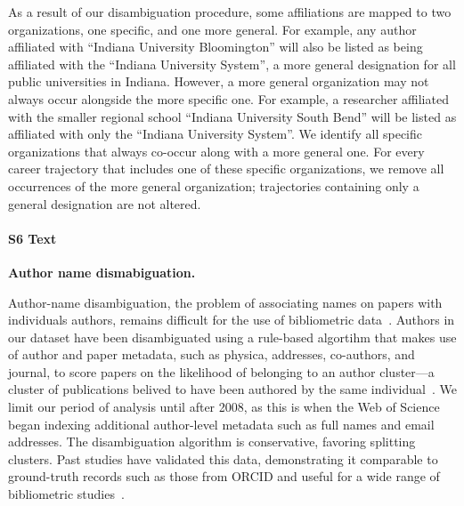 \documentclass[12pt]{article} %
\begin{document}
As a result of our disambiguation procedure, some affiliations are mapped to two organizations, one specific, and one more general.
For example, any author affiliated with ``Indiana University Bloomington'' will also be listed as being affiliated with the ``Indiana University System'', a more general designation for all public universities in Indiana.
However, a more general organization may not always occur alongside the more specific one.
For example, a researcher affiliated with the smaller regional school ``Indiana University South Bend'' will be listed as affiliated with only the ``Indiana University System''.
We identify all specific organizations that always co-occur along with a more general one.
For every career trajectory that includes one of these specific organizations, we remove all occurrences of the more general organization;
trajectories containing only a general designation are not altered.



%
\paragraph*{S6 Text}
\label{si:text:disambiguation}
{\bf Author name dismabiguation.}

Author-name disambiguation, the problem of associating names on papers with individuals authors, remains difficult for the use of bibliometric data~\autocite{dangelo2020disambiguation}. 
Authors in our dataset have been disambiguated using a rule-based algortihm that makes use of author and paper metadata, such as physica, addresses, co-authors, and journal, to score papers on the likelihood of belonging to an author cluster—a cluster of publications belived to have been authored by the same individual~\autocite{caron2014disambiguation}. 
We limit our period of analysis until after 2008, as this is when the Web of Science began indexing additional author-level metadata such as full names and email addresses. 
The disambiguation algorithm is conservative, favoring splitting clusters. 
Past studies have validated this data, demonstrating it comparable to ground-truth records such as those from ORCID and useful for a wide range of bibliometric studies~\cite{sugimoto2017mostimpact, robinson2019mobility, chinchilla2018global, chinchilla2018travelban}.


\newpage
\end{document}
